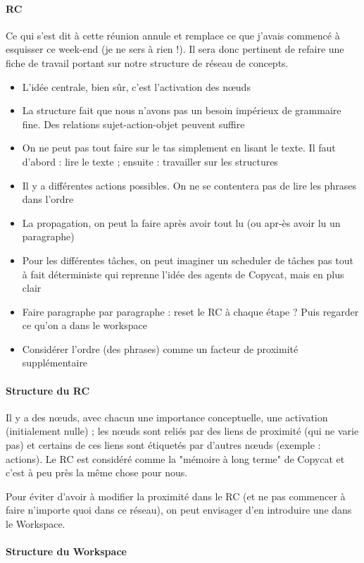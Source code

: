 \documentclass{article}
\begin{document}
\paragraph{RC}
Ce qui s'est dit à cette réunion annule et remplace ce que j'avais commencé à esquisser ce week-end (je ne sers à rien !). Il sera donc pertinent de refaire une fiche de travail portant sur notre structure de réseau de concepts.
\begin{itemize}
 \item L'idée centrale, bien sûr, c'est l'activation des nœuds
 \item La structure fait que nous n'avons pas un besoin impérieux de grammaire fine. Des relations sujet-action-objet peuvent suffire
 \item On ne peut pas tout faire sur le tas simplement en lisant le texte. Il faut d'abord : lire le texte ; ensuite : travailler sur les structures
 \item Il y a différentes actions possibles. On ne se contentera pas de lire les phrases dans l'ordre
 \item La propagation, on peut la faire après avoir tout lu (ou apr-ès avoir lu un paragraphe)
 \item Pour les différentes tâches, on peut imaginer un scheduler de tâches pas tout à fait déterministe qui reprenne l'idée des agents de Copycat, mais en plus clair
 \item Faire paragraphe par paragraphe : reset le RC à chaque étape ? Puis regarder ce qu'on a dans le workspace
 \item Considérer l'ordre (des phrases) comme un facteur de proximité supplémentaire
\end{itemize}

\paragraph{Structure du RC}
Il y a des nœuds, avec chacun une importance conceptuelle, une activation (initialement nulle) ; les nœuds sont reliés par des liens de proximité (qui ne varie pas) et certains de ces liens sont étiquetés par d'autres nœuds (exemple : actions). Le RC est considéré comme la "mémoire à long terme" de Copycat et c'est à peu près la même chose pour nous.

Pour éviter d'avoir à modifier la proximité dans le RC (et ne pas commencer à faire n'importe quoi dans ce réseau), on peut envisager d'en introduire une dans le Workspace.

\paragraph{Structure du Workspace}
\end{document}
